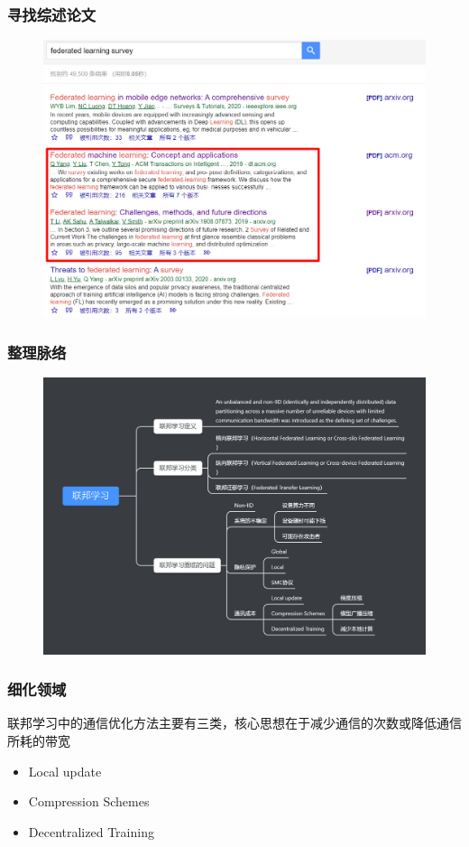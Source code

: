 \documentclass[hyperref={pdfpagelabels=false}]{beamer}
\begin{document}
\begin{frame}
	\frametitle{寻找综述论文}
	\begin{figure}
		\centering
		\includegraphics[height=0.8\textheight]{./figure/3.png}
	\end{figure}
\end{frame}

\begin{frame}
	\frametitle{整理脉络}
	\begin{figure}
		\centering
		\includegraphics[height=0.8\textheight]{./figure/mubu.png}
	\end{figure}
\end{frame}

\begin{frame}
	\frametitle{细化领域}
	联邦学习中的通信优化方法主要有三类，核心思想在于减少通信的次数或降低通信所耗的带宽
	\begin{itemize}
		\item Local update
		\item Compression Schemes
		\item Decentralized Training
	\end{itemize}
\end{frame}
\end{document}
